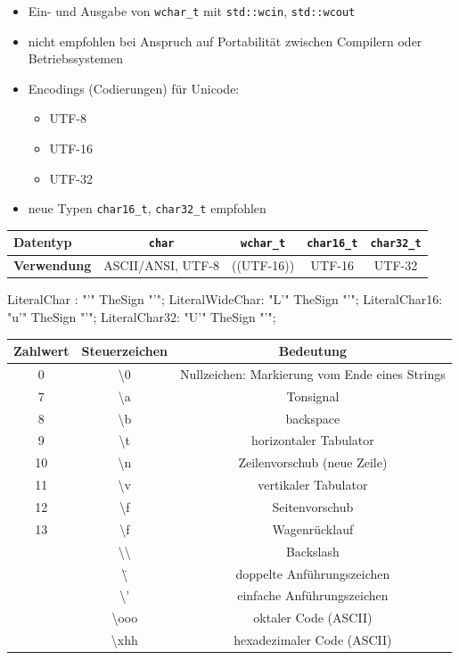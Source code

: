\documentclass[a4paper]{report}
\begin{document}
\begin{itemize}
\begin{itemize}
		\item  Ein- und Ausgabe von \texttt{wchar\_t} mit \texttt{std::wcin}, \texttt{std::wcout}
		\item nicht empfohlen bei Anspruch auf Portabilität zwischen Compilern oder Betriebssystemen
		\bigskip
		\item Encodings (Codierungen) für Unicode:
		\begin{itemize}
			\item UTF-8
			\item UTF-16
			\item UTF-32
		\end{itemize}
		\item neue Typen \texttt{char16\_t}, \texttt{char32\_t} empfohlen
	\end{itemize}
		
\end{itemize}
\begin{center}
\begin{tabular}{|p{4cm}|c|c|c|c|} \hline
	\textbf{Datentyp} & \texttt{char} & \texttt{wchar\_t} & \texttt{char16\_t} & \texttt{char32\_t} \\ \hline
	\textbf{Verwendung}  & ASCII/ANSI, UTF-8 & ((UTF-16)) & UTF-16 & UTF-32 \\ \hline
\end{tabular}
\end{center}

\begin{rail}
	LiteralChar : "'" TheSign "'";
	LiteralWideChar: "L'" TheSign "'";
	LiteralChar16: "u'" TheSign "'";
	LiteralChar32: "U'" TheSign "'";
\end{rail}

\begin{center}
\begin{tabular}{|ccc|} \hline
	\textbf{Zahlwert} & \textbf{Steuerzeichen} & \textbf{Bedeutung} \\ \hline
	0 & \textbackslash 0 & Nullzeichen: Markierung vom Ende eines Strings \\
	7 & \textbackslash a & Tonsignal \\ \hline
	8 & \textbackslash b & backspace \\
	9 & \textbackslash t & horizontaler Tabulator \\ \hline
	10 & \textbackslash n & Zeilenvorschub (neue Zeile) \\
	11 & \textbackslash v & vertikaler Tabulator \\ \hline
	12 & \textbackslash f & Seitenvorschub \\
	13 & \textbackslash f & Wagenrücklauf \\ \hline
	& \textbackslash \textbackslash & Backslash \\
	& \textbackslash \" & doppelte Anführungszeichen \\ \hline
	& \textbackslash ' & einfache Anführungszeichen \\
	& \textbackslash ooo & oktaler Code (ASCII) \\ \hline
	& \textbackslash xhh & hexadezimaler Code (ASCII) \\ \hline
\end{tabular}
	\end{center}
\end{document}
